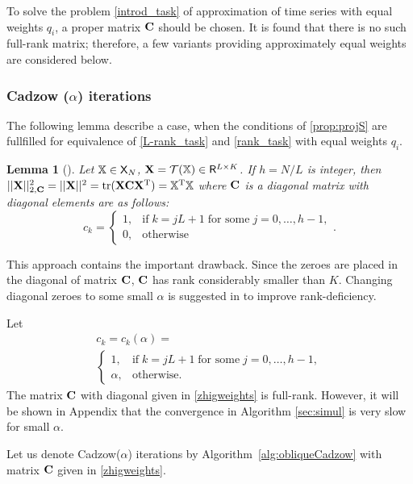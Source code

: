 \documentclass[sii]{ipart}
\DeclareMathOperator{\tr}{tr}
\newtheorem{lemma}{Lemma}
\begin{document}
To solve the problem \eqref{introd_task} of approximation of time series with equal weights $q_i$, a proper matrix $\mathbf{C}$ should be chosen. It is found that there is no such full-rank matrix; therefore, a few variants providing approximately equal weights are considered below.

\subsubsection{Cadzow ($\alpha$) iterations}
\label{sec:cadzow_alpha}
The following lemma describe a case, when the conditions of \ref{prop:projS} are fullfilled for equivalence of \eqref{L-rank_task} and \eqref{rank_task} with equal weights $q_i$.
\begin{lemma}[\cite{Gillard2014}]
	\label{zhiglemma}
	Let $\mathbb{X} \in \mathsf{X}_N$, $\mathbf{X} = \mathcal{T}(\mathbb{X}) \in \mathsf{R}^{L \times K}$. If $h = N/L$ is integer, then $||\bfX||^2_{2, \bfC} = ||\bfX||^2 = \tr(\bfX \bfC \bfX^\rmT) = \tsX^\rmT \tsX$ where $\mathbf{C}$ is a diagonal matrix with diagonal elements are as follows:
	\begin{equation*}
	c_k = \begin{cases}
	1, & \text{if} \; k = jL+1 \;\text{for some} \; j = 0, \ldots, h-1, \\
	0, & \text{otherwise}
	\end{cases}.
	\end{equation*}
\end{lemma}

This approach contains the important drawback. Since the zeroes are placed in the diagonal of matrix $\mathbf{C}$, $\mathbf{C}$ has rank considerably smaller than $K$. Changing diagonal zeroes to some small $\alpha$ is suggested in \cite{Gillard2014} to improve rank-deficiency.

Let
\begin{multline}\label{zhigweights}
c_k = c_k(\alpha) =\\ \begin{cases}
1, & \text{if} \; k = jL+1 \; \text{for some} \; j = 0, \ldots, h-1, \\
\alpha, & \text{otherwise.}
\end{cases}
\end{multline}
The matrix $\mathbf{C}$ with diagonal given in \ref{zhigweights} is full-rank. However, it will be shown in Appendix that the convergence in Algorithm \ref{sec:simul} is very slow for small $\alpha$.

Let us denote Cadzow($\alpha$) iterations by Algorithm~\ref{alg:obliqueCadzow} with matrix $\mathbf{C}$  given in \eqref{zhigweights}.
\end{document}
